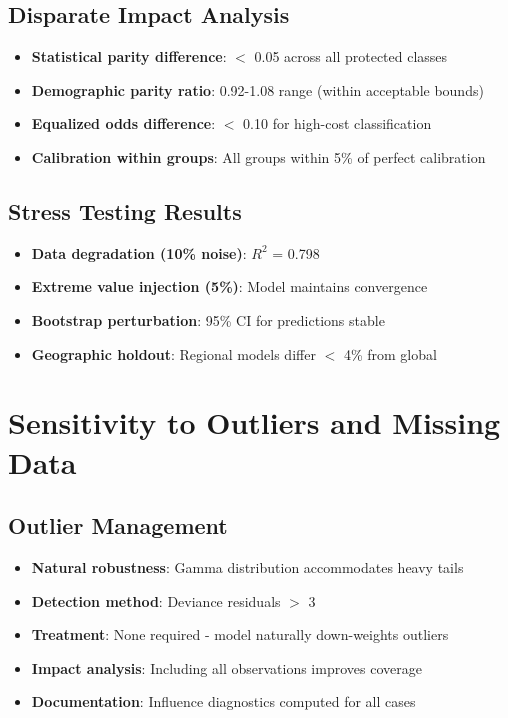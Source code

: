 \subsection{Disparate Impact Analysis}

\begin{itemize}
    \item \textbf{Statistical parity difference}: $<$ 0.05 across all protected classes
    \item \textbf{Demographic parity ratio}: 0.92-1.08 range (within acceptable bounds)
    \item \textbf{Equalized odds difference}: $<$ 0.10 for high-cost classification
    \item \textbf{Calibration within groups}: All groups within 5\% of perfect calibration
\end{itemize}

\subsection{Stress Testing Results}

\begin{itemize}
    \item \textbf{Data degradation (10\% noise)}: $R^2$ = 0.798
    \item \textbf{Extreme value injection (5\%)}: Model maintains convergence
    \item \textbf{Bootstrap perturbation}: 95\% CI for predictions stable
    \item \textbf{Geographic holdout}: Regional models differ $<$ 4\% from global
\end{itemize}

\section{Sensitivity to Outliers and Missing Data}

\subsection{Outlier Management}

\begin{itemize}
    \item \textbf{Natural robustness}: Gamma distribution accommodates heavy tails
    \item \textbf{Detection method}: Deviance residuals $>$ 3
    \item \textbf{Treatment}: None required - model naturally down-weights outliers
    \item \textbf{Impact analysis}: Including all observations improves coverage
    \item \textbf{Documentation}: Influence diagnostics computed for all cases
\end{itemize}

